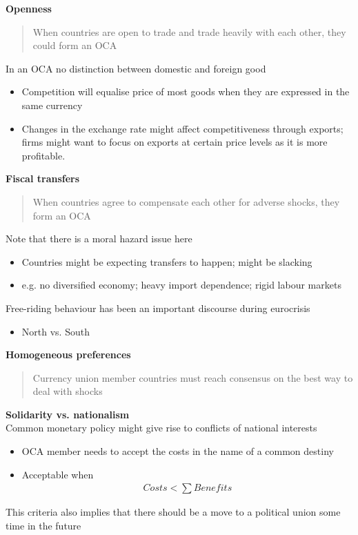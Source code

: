 \documentclass{beamer}
\begin{document}
\begin{frame}
  \textbf{Openness} 
  \begin{quote}
    When countries are open to trade and trade heavily with each other, they could form an OCA
  \end{quote}
  \medskip
  In an OCA no distinction between domestic and foreign good
  \begin{itemize}
    \item Competition will equalise price of most goods when they are expressed in the same currency
    \item Changes in the exchange rate might affect competitiveness through exports; firms might want to focus on exports at certain price levels as it is more profitable.
  \end{itemize}
\end{frame}


\begin{frame}
  \textbf{Fiscal transfers} 
  \begin{quote}
    When countries agree to compensate each other for adverse shocks, they form an OCA
  \end{quote}
  \medskip
  Note that there is a moral hazard issue here
  \begin{itemize}
    \item Countries might be expecting transfers to happen; might be slacking
    \item e.g. no diversified economy; heavy import dependence; rigid labour markets
  \end{itemize}
  \medskip
  Free-riding behaviour has been an important discourse during eurocrisis
  \begin{itemize}
    \item North vs. South
  \end{itemize}
\end{frame}

\begin{frame}
  \textbf{Homogeneous preferences}
  \begin{quote}
    Currency union member countries must reach consensus on the best way to deal with shocks
  \end{quote}
    \medskip
  \textbf{Solidarity vs. nationalism}\\
   Common monetary policy might give rise to conflicts of national interests
  \begin{itemize}
    \item OCA member needs to accept the costs in the name of a common destiny
    \item Acceptable when
    \begin{align*}
      Costs < \sum Benefits
    \end{align*}    
  \end{itemize}
  This criteria also implies that there should be a move to a political union some time in the future
\end{frame}
\end{document}
